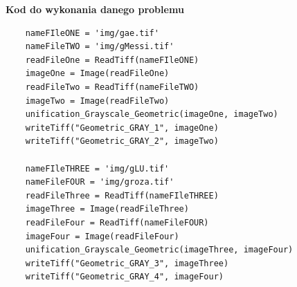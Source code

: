 \documentclass[magisterska,openany]{pracadypl}
\begin{document}
\vspace{0.5cm}
\textbf{\Large Kod do wykonania danego problemu}
\lstset{language=Python}
\vspace{0.25cm}
\begin{lstlisting}
	nameFIleONE = 'img/gae.tif'
	nameFileTWO = 'img/gMessi.tif'
	readFileOne = ReadTiff(nameFIleONE)
	imageOne = Image(readFileOne)
	readFileTwo = ReadTiff(nameFileTWO)
	imageTwo = Image(readFileTwo)
	unification_Grayscale_Geometric(imageOne, imageTwo)
	writeTiff("Geometric_GRAY_1", imageOne)
	writeTiff("Geometric_GRAY_2", imageTwo)

	nameFIleTHREE = 'img/gLU.tif'
	nameFileFOUR = 'img/groza.tif'
	readFileThree = ReadTiff(nameFIleTHREE)
	imageThree = Image(readFileThree)
	readFileFour = ReadTiff(nameFileFOUR)
	imageFour = Image(readFileFour)
	unification_Grayscale_Geometric(imageThree, imageFour)
	writeTiff("Geometric_GRAY_3", imageThree)
	writeTiff("Geometric_GRAY_4", imageFour)

\end{lstlisting}
\end{document}
